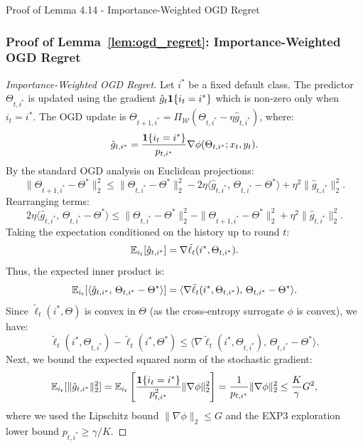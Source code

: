 \begin{sourceblock}{Proof of Lemma 4.14 - Importance-Weighted OGD Regret}
\subsubsection*{Proof of Lemma~\ref{lem:ogd_regret}: Importance-Weighted OGD Regret}
\label{app:proof_ogd_regret}
\begin{proof}[Importance-Weighted OGD Regret]
Let $i^*$ be a fixed default class. The predictor $\Theta_{t, i^*}$ is updated using the gradient $\hat{g}_t \mathbf{1}\{i_t = i^*\}$ which is non-zero only when $i_t = i^*$. The OGD update is $\Theta_{t+1, i^*} = \Pi_{\mathcal{W}}\left( \Theta_{t, i^*} - \eta \hat{g}_{t, i^*} \right)$, where:
\begin{equation}
    \hat{g}_{t, i^*} = \frac{\mathbf{1}\{i_t = i^*\}}{p_{t, i^*}} \nabla \phi(\Theta_{t, i^*}; x_t, y_t).
\end{equation}
By the standard OGD analysis on Euclidean projections:
\begin{equation}
    \|\Theta_{t+1, i^*} - \Theta^*\|_2^2 \le \|\Theta_{t, i^*} - \Theta^*\|_2^2 - 2\eta \langle \hat{g}_{t, i^*}, \, \Theta_{t, i^*} - \Theta^* \rangle + \eta^2 \|\hat{g}_{t, i^*}\|_2^2.
\end{equation}
Rearranging terms:
\begin{equation}
    2\eta \langle \hat{g}_{t, i^*}, \, \Theta_{t, i^*} - \Theta^* \rangle \le \|\Theta_{t, i^*} - \Theta^*\|_2^2 - \|\Theta_{t+1, i^*} - \Theta^*\|_2^2 + \eta^2 \|\hat{g}_{t, i^*}\|_2^2.
\end{equation}
Taking the expectation conditioned on the history up to round $t$:
\begin{equation}
    \mathbb{E}_{i_t}[\hat{g}_{t, i^*}] = \nabla \tilde{\ell}{}_t(i^*, \Theta_{t, i^*}).
\end{equation}
Thus, the expected inner product is:
\begin{equation}
    \mathbb{E}_{i_t}[\langle \hat{g}_{t, i^*}, \, \Theta_{t, i^*} - \Theta^* \rangle] = \langle \nabla \tilde{\ell}_t(i^*, \Theta_{t, i^*}), \, \Theta_{t, i^*} - \Theta^* \rangle.
\end{equation}
Since $\tilde{\ell}_t(i^*, \Theta)$ is convex in $\Theta$ (as the cross-entropy surrogate $\phi$ is convex), we have:
\begin{equation}
    \tilde{\ell}_t(i^*, \Theta_{t, i^*}) - \tilde{\ell}_t(i^*, \Theta^*) \le \langle \nabla \tilde{\ell}_t(i^*, \Theta_{t, i^*}), \, \Theta_{t, i^*} - \Theta^* \rangle.
\end{equation}
Next, we bound the expected squared norm of the stochastic gradient:
\begin{equation}
    \mathbb{E}_{i_t}[\|\hat{g}_{t, i^*}\|_2^2] = \mathbb{E}_{i_t}\left[ \frac{\mathbf{1}\{i_t = i^*\}}{p_{t, i^*}^2} \|\nabla \phi\|_2^2 \right] = \frac{1}{p_{t, i^*}} \|\nabla \phi\|_2^2 \le \frac{K}{\gamma} G^2,
\end{equation}
where we used the Lipschitz bound $\|\nabla \phi\|_2 \le G$ and the EXP3 exploration lower bound $p_{t, i^*} \ge \gamma/K$.


\end{proof}
\end{sourceblock}
